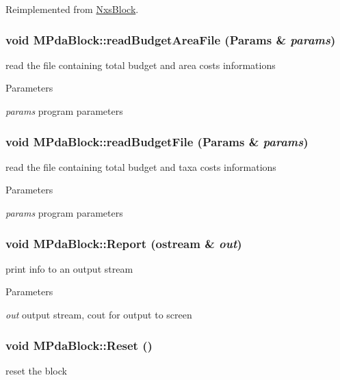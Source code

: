 Reimplemented from \hyperlink{classNxsBlock}{NxsBlock}.\hypertarget{classMPdaBlock_af0f2d47828ca74a66567e2655ceb3c83}{
\subsubsection[{readBudgetAreaFile}]{\setlength{\rightskip}{0pt plus 5cm}void MPdaBlock::readBudgetAreaFile ({\bf Params} \& {\em params})}}
\label{classMPdaBlock_af0f2d47828ca74a66567e2655ceb3c83}
read the file containing total budget and area costs informations 
\begin{DoxyParams}{Parameters}
\item[{\em params}]program parameters \end{DoxyParams}
\hypertarget{classMPdaBlock_a0ce085cb000043bf029ef69abf4a97da}{
\subsubsection[{readBudgetFile}]{\setlength{\rightskip}{0pt plus 5cm}void MPdaBlock::readBudgetFile ({\bf Params} \& {\em params})}}
\label{classMPdaBlock_a0ce085cb000043bf029ef69abf4a97da}
read the file containing total budget and taxa costs informations 
\begin{DoxyParams}{Parameters}
\item[{\em params}]program parameters \end{DoxyParams}
\hypertarget{classMPdaBlock_a2ff807bfbacc967eabb5dd643c557fb4}{
\subsubsection[{Report}]{\setlength{\rightskip}{0pt plus 5cm}void MPdaBlock::Report (ostream \& {\em out})}}
\label{classMPdaBlock_a2ff807bfbacc967eabb5dd643c557fb4}
print info to an output stream 
\begin{DoxyParams}{Parameters}
\item[{\em out}]output stream, cout for output to screen \end{DoxyParams}
\hypertarget{classMPdaBlock_aba6f6df591c6d1938470e1d13cd9dbef}{
\subsubsection[{Reset}]{\setlength{\rightskip}{0pt plus 5cm}void MPdaBlock::Reset ()}}
\label{classMPdaBlock_aba6f6df591c6d1938470e1d13cd9dbef}
reset the block 

